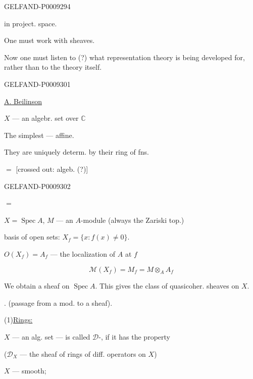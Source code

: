 \begin{GelfandAdjacentEvidence}{GELFAND-P000929}{4}


\qquad in project. space.

One must work with sheaves.

Now one must listen to (?) what representation theory is being developed for, rather than to the theory itself.
\end{GelfandAdjacentEvidence}



\begin{GelfandAdjacentEvidence}{GELFAND-P000930}{1}

\underline{A. Beilinson}

$X$ --- an algebr. set over $\mathbb C$

The simplest --- affine.

They are uniquely determ. by their ring of fns.

 $=$ [crossed out: algeb. (?)] 
\end{GelfandAdjacentEvidence}
\begin{GelfandAdjacentEvidence}{GELFAND-P000930}{2}


 $=$ 

$X=\operatorname{Spec} A$, $M$ --- an $A$-module (always the Zariski top.)

basis of open sets: \(X_f=\{x:f(x)\ne0\}\).

$O(X_f)=A_f$ --- the localization of $A$ at $f$

\[
 \mathcal M(X_f)=M_f=M\otimes_A A_f
\]

We obtain a sheaf on $\operatorname{Spec} A$. This gives the class of quasicoher. sheaves on $X$.

. (passage from a mod. to a sheaf).

(1)\quad \underline{Rings:} 

$X$ --- an alg. set --- is called $\mathcal D$-, if it has the property

($\mathcal D_X$ --- the sheaf of rings of diff. operators on $X$)

$X$ --- smooth;
\end{GelfandAdjacentEvidence}
